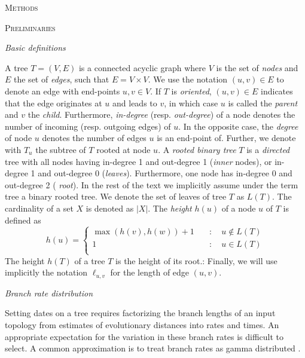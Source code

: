 \documentclass{llncs}
\renewcommand{\section}[1]{%
\bigskip
\begin{center}
\begin{Large}
\normalfont\scshape #1
\medskip
\end{Large}
\end{center}}
\renewcommand{\subsection}[1]{%
\bigskip
\begin{center}
\begin{large}
\normalfont\itshape #1
\end{large}
\end{center}}
\begin{document}
\section{Methods}

\section {Preliminaries}
%
%
\subsection{Basic definitions}
%
A tree $T=(V,E)$ is a connected acyclic graph where $V$ is the set of {\em
nodes} and $E$ the set of {\em edges}, such that $E = V\times V$. We use the
notation $(u,v) \in E$ to denote an edge with end-points $u,v \in V$. If $T$ is
{\em oriented}, $(u,v) \in E$ indicates that the edge originates at $u$ and leads
to $v$, in which case $u$ is called the {\em parent} and $v$ the {\em child}.
Furthermore, {\em in-degree} (resp. {\em out-degree}) of a node denotes the
number of incoming (resp. outgoing edges) of $u$. In the opposite case, the
{\em degree} of node $u$ denotes the number of edges $u$ is an end-point of.
Further, we denote with $T_u$ the subtree of $T$ rooted at node $u$.  A {\em
rooted binary tree} $T$ is a {\em directed} tree with all nodes having
in-degree 1 and out-degree 1 ({\em inner} nodes), or in-degree 1 and out-degree
0 ({\em leaves}). Furthermore, one node has in-degree 0 and out-degree 2 ({\em
root}).  In the rest of the text we implicitly assume under the term tree a
binary rooted tree.  We denote the set of leaves of tree $T$ as $L(T)$.  The
cardinality of a set $X$ is denoted as $|X|$. The {\em height} $h(u)$ of a node
$u$ of $T$ is defined as 
%
\[ h(u) = \left\{ \begin{array}{ll}
\max(h(v), h(w)) + 1 & \quad : \quad u \notin L(T)\\
1                    & \quad : \quad u    \in L(T)\\
\end{array}\right. \] 
The height $h(T)$ of a tree $T$ is the height of its root.: Finally, we will
use implicitly the notation $\ell_{u,v}$ for the length of edge $(u,v)$.

\subsection{Branch rate distribution}
Setting dates on a tree requires factorizing the branch lengths of an input topology
from estimates of evolutionary distances into rates and times. 
An appropriate expectation for the variation in these branch rates is difficult to select.
A common approximation is to treat branch rates as gamma distributed \citep{Kishino2001}.
\end{document}

